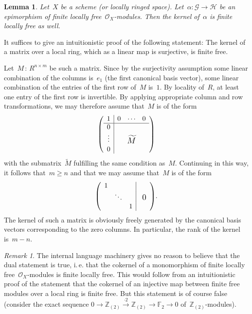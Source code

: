 \documentclass[10pt,reqno,a4paper]{amsbook}
\makeatletter
\theoremstyle{definition}
\theoremstyle{plain}
\newtheorem{lemma}[defn]{Lemma}
\theoremstyle{remark}
\newtheorem{rem}[defn]{Remark}
\newcommand{\ZZ}{\mathbb{Z}}
\newcommand{\FF}{\mathbb{F}}
\renewcommand{\G}{\mathcal{G}}
\renewcommand{\H}{\mathcal{H}}
\renewcommand{\O}{\mathcal{O}}
\newcommand{\?}{\,{:}\,}
\renewcommand{\_}{\mathpunct{.}\,}
\newcommand{\lra}{\longrightarrow}
\newcommand{\ie}{i.\,e.\@\xspace}
\renewenvironment{proof}[1][\proofname]{\par
  \pushQED{\qed}%
  \normalfont \topsep6\p@\@plus6\p@\relax
  \trivlist
  \item[\hskip\labelsep
        \itshape
    #1\@addpunct{.}]\ignorespaces
}{%
  \popQED\endtrivlist\@endpefalse
}
\makeatother
\begin{document}
\begin{lemma}\label{lemma:kernel-of-epi-fingen}
Let~$X$ be a scheme (or locally ringed space). Let~$\alpha : \G
\to \H$ be an epimorphism of finite locally free~$\O_X$-modules. Then the
kernel of~$\alpha$ is finite locally free as well.\end{lemma}
\begin{proof}It suffices to give an intuitionistic proof of the following
statement: The kernel of a matrix over a local ring, which as a linear map is
surjective, is finite free.

Let~$M \? R^{n \times m}$ be such a matrix. Since by the surjectivity
assumption some linear combination of the columns is~$e_1$ (the first canonical
basis vector), some linear combination of the entries of the first row of~$M$
is~$1$. By locality of~$R$, at least one entry of the first row is invertible.
By applying appropriate column and row transformations, we may therefore assume that~$M$
is of the form
\[ \left(
  \begin{array}{c|ccc}
    1 & 0 & \cdots & 0 \\ \hline
    0 & \multicolumn{3}{c}{\multirow{3}{*}{\raisebox{-5mm}{\scalebox{1.2}{$\widetilde M$}}}} \\
    \raisebox{2pt}{\vdots} & & & \\
    0 & & &
  \end{array}
\right) \]
with the submatrix~$\widetilde M$ fulfilling the same condition as~$M$.
Continuing in this way, it follows that~$m \geq n$ and that we may assume
that~$M$ is of the form
\[ \left(
  \begin{array}{ccc|c}
    1 & & & \multirow{3}{*}{\raisebox{-3mm}{\scalebox{1.2}{\ 0}}} \\
    & \ddots && \\
    && 1
  \end{array}
\right)\!. \]
The kernel of such a matrix is obviously freely generated by the canonical
basis vectors corresponding to the zero columns. In particular, the rank of the
kernel is~$m-n$.
\end{proof}

\begin{rem}The internal language machinery gives no reason to believe that the
dual statement is true, \ie that the cokernel of a monomorphism of finite
locally free~$\O_X$-modules is finite locally free. This would follow from
an intuitionistic proof of the statement that the cokernel of an injective map
between finite free modules over a local ring is finite free. But this
statement is of course false (consider the exact sequence
$0 \lra \ZZ_{(2)} \stackrel{\cdot 2}{\lra} \ZZ_{(2)} \lra \FF_2 \lra 0$
of~$\ZZ_{(2)}$-modules).
\end{rem}
\end{document}
